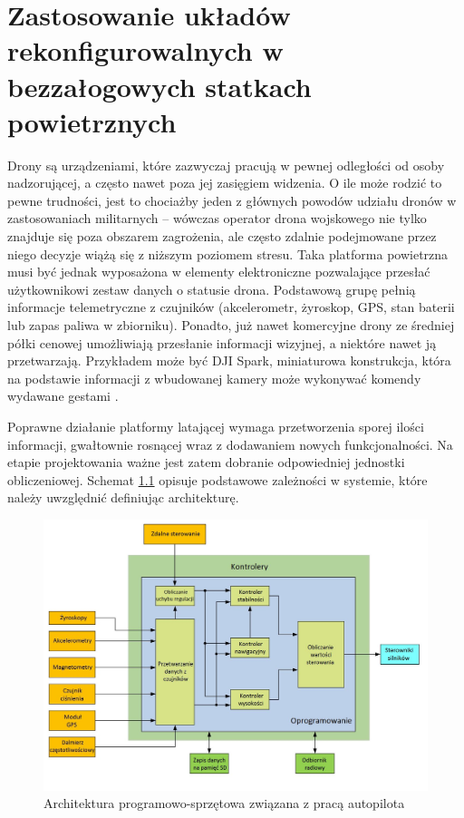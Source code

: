 \chapter{Zastosowanie układów rekonfigurowalnych w bezzałogowych statkach powietrznych}

Drony są urządzeniami, które zazwyczaj pracują w pewnej odległości od osoby nadzorującej, a często nawet poza jej zasięgiem widzenia. 
O ile może rodzić to pewne trudności, jest to chociażby jeden z głównych powodów udziału dronów w zastosowaniach militarnych -- wówczas operator drona wojskowego nie tylko znajduje się poza obszarem zagrożenia, ale często zdalnie podejmowane przez niego decyzje wiążą się z niższym poziomem stresu. 
Taka platforma powietrzna musi być jednak wyposażona w elementy elektroniczne pozwalające przesłać użytkownikowi zestaw danych o statusie drona. 
Podstawową grupę pełnią informacje telemetryczne z czujników (akcelerometr, żyroskop, GPS, stan baterii lub zapas paliwa w zbiorniku). 
Ponadto, już nawet komercyjne drony ze średniej półki cenowej umożliwiają przesłanie informacji wizyjnej, a niektóre nawet ją przetwarzają. 
Przykładem może być DJI Spark, miniaturowa konstrukcja, która na podstawie informacji z wbudowanej kamery może wykonywać komendy wydawane gestami \cite{SPARK}.

Poprawne działanie platformy latającej wymaga przetworzenia sporej ilości informacji, gwałtownie rosnącej wraz z dodawaniem nowych funkcjonalności. 
Na etapie projektowania ważne jest zatem dobranie odpowiedniej jednostki obliczeniowej. 
Schemat \ref{fig:autopilot_architecture} opisuje podstawowe zależności w systemie, które należy uwzględnić definiując architekturę.
\begin{figure}[h]
	\centering
	\includegraphics[width=12cm]{7_drone_platform_overview.jpg}
	\caption{Architektura programowo-sprzętowa związana z pracą autopilota \cite{Bouhali2017} }
	\label{fig:autopilot_architecture}
\end{figure} 


